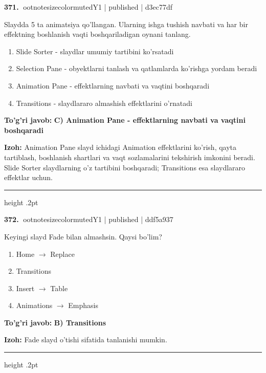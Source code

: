 \documentclass[10pt,a4paper]{article}
\begin{document}
\textbf{\color{ink}371.} {ootnotesizecolor{muted}Y1 | published | d3ec77df}
\par
Slaydda 5 ta animatsiya qo'llangan. Ularning ishga tushish navbati va har bir effektning boshlanish vaqti boshqariladigan oynani tanlang.
\begin{enumerate}[label=\Alph*),leftmargin=9mm]
\item Slide Sorter - slaydlar umumiy tartibini ko'rsatadi
\item Selection Pane - obyektlarni tanlash va qatlamlarda ko'rishga yordam beradi
\item Animation Pane - effektlarning navbati va vaqtini boshqaradi
\item Transitions - slaydlararo almashish effektlarini o'rnatadi
\end{enumerate}
\begin{tcolorbox}[enhanced,breakable,colback=teal!4,colframe=teal!55!black,boxrule=0.45pt,arc=1.2mm,left=2.8mm,right=2.8mm,top=2mm,bottom=2mm]
\textbf{\color{teal}To'g'ri javob:} \textbf{C) Animation Pane - effektlarning navbati va vaqtini boshqaradi}
\par\smallskip
\textbf{Izoh:} Animation Pane slayd ichidagi Animation effektlarini ko'rish, qayta tartiblash, boshlanish shartlari va vaqt sozlamalarini tekshirish imkonini beradi. Slide Sorter slaydlarning o'z tartibini boshqaradi; Transitions esa slaydlararo effektlar uchun.
\end{tcolorbox}
\vspace{2mm}\hrule height .2pt\vspace{2mm}

\textbf{\color{ink}372.} {ootnotesizecolor{muted}Y1 | published | ddf5a937}
\par
Keyingi slayd Fade bilan almashsin. Qaysi bo'lim?
\begin{enumerate}[label=\Alph*),leftmargin=9mm]
\item Home \ensuremath{\rightarrow} Replace
\item Transitions
\item Insert \ensuremath{\rightarrow} Table
\item Animations \ensuremath{\rightarrow} Emphasis
\end{enumerate}
\begin{tcolorbox}[enhanced,breakable,colback=teal!4,colframe=teal!55!black,boxrule=0.45pt,arc=1.2mm,left=2.8mm,right=2.8mm,top=2mm,bottom=2mm]
\textbf{\color{teal}To'g'ri javob:} \textbf{B) Transitions}
\par\smallskip
\textbf{Izoh:} Fade slayd o'tishi sifatida tanlanishi mumkin.
\end{tcolorbox}
\vspace{2mm}\hrule height .2pt\vspace{2mm}
\end{document}
